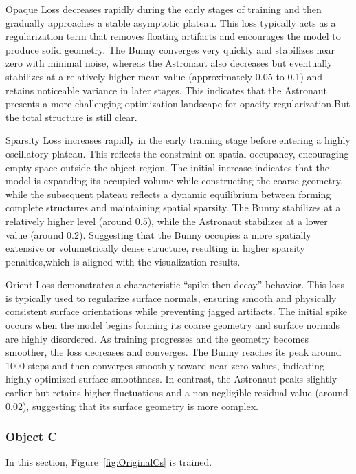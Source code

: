 Opaque Loss decreases rapidly during the early stages of training and then gradually approaches a stable asymptotic plateau. This loss typically acts as a regularization term that removes floating artifacts and encourages the model to produce solid geometry. The Bunny converges very quickly and stabilizes near zero with minimal noise, whereas the Astronaut also decreases but eventually stabilizes at a relatively higher mean value (approximately 0.05 to 0.1) and retains noticeable variance in later stages. This indicates that the Astronaut presents a more challenging optimization landscape for opacity regularization.But the total structure is still clear.

Sparsity Loss increases rapidly in the early training stage before entering a highly oscillatory plateau. This reflects the constraint on spatial occupancy, encouraging empty space outside the object region. The initial increase indicates that the model is expanding its occupied volume while constructing the coarse geometry, while the subsequent plateau reflects a dynamic equilibrium between forming complete structures and maintaining spatial sparsity. The Bunny stabilizes at a relatively higher level (around 0.5), while the Astronaut stabilizes at a lower value (around 0.2). Suggesting that the Bunny occupies a more spatially extensive or volumetrically dense structure, resulting in higher sparsity penalties,which is aligned with the visualization results.

Orient Loss demonstrates a characteristic “spike-then-decay” behavior. This loss is typically used to regularize surface normals, ensuring smooth and physically consistent surface orientations while preventing jagged artifacts. The initial spike occurs when the model begins forming its coarse geometry and surface normals are highly disordered. As training progresses and the geometry becomes smoother, the loss decreases and converges. The Bunny reaches its peak around 1000 steps and then converges smoothly toward near-zero values, indicating highly optimized surface smoothness. In contrast, the Astronaut peaks slightly earlier but retains higher fluctuations and a non-negligible residual value (around 0.02), suggesting that its surface geometry is more complex.








\subsubsection{Object C}
In this section, Figure~\ref{fig:OriginalCs} is trained.

